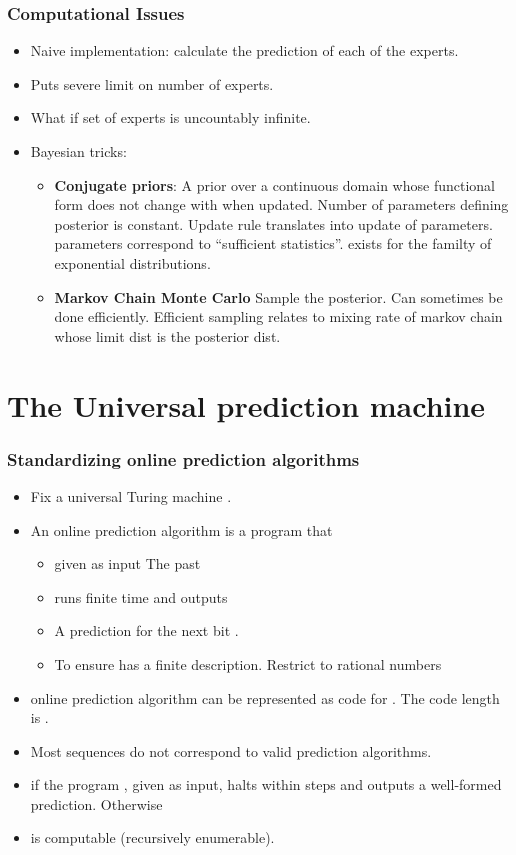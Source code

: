 \documentclass{beamer}
\begin{document}
\begin{frame}
\frametitle{Computational Issues}
\begin{itemize}
\item Naive implementation: calculate the prediction of each of 
the  experts.
\item Puts severe limit on number of experts.
\item What if set of experts is uncountably infinite.
\item Bayesian tricks:
\begin{itemize}
\item {\bf Conjugate priors}: A prior over a continuous domain whose functional form does not change with when updated. 
\pause Number of parameters defining posterior is constant. 
\pause Update rule translates into update of parameters.
\pause parameters correspond to ``sufficient statistics''.
\pause exists for the familty of exponential distributions.
\item {\bf Markov Chain Monte Carlo} Sample the posterior. 
\pause Can sometimes be done efficiently.
\pause Efficient sampling relates to mixing rate of markov chain whose limit dist is the posterior dist. 
\end{itemize}
\end{itemize}
\end{frame}

\section{The Universal prediction machine}

\begin{frame}
\frametitle{Standardizing online prediction algorithms}
\begin{itemize}
\item Fix a universal Turing machine .
\item An online prediction algorithm  is a program that 
\begin{itemize}
\item
given as input {\color{blue} The past} 
\item runs finite time and outputs
\item
A prediction for the next bit .
\item 
To ensure  has a finite description. Restrict to {\color{blue}rational} numbers 
\end{itemize}

\item {} online prediction algorithm can be represented as code 
for . The code length is .
\item Most sequences do not correspond to valid prediction algorithms. 
\item 
{} if the program \R{$\vb$}, given \R{$\X$} as input, 
halts within  steps and outputs a well-formed prediction. Otherwise 
\item {} is computable (recursively enumerable).
\end{itemize}
\end{frame}
\end{document}

